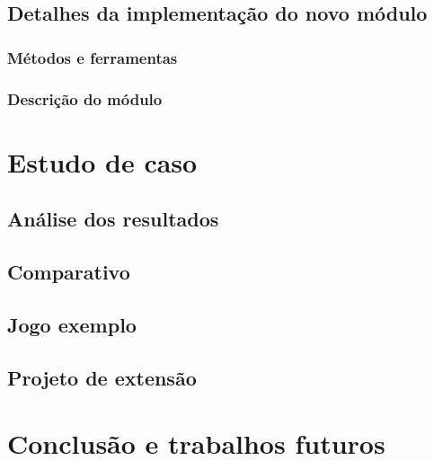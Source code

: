 \documentclass[12pt,twoside,openright,a4paper,english,brazil,sumario=tradicional]{abntex2}
\begin{document}
\section{Detalhes da implementação do novo módulo}
\subsection{Métodos e ferramentas}
\subsection{Descrição do módulo}

\chapter{Estudo de caso}
\label{chap:caso}
\section{Análise dos resultados}
\section{Comparativo}
\section{Jogo exemplo}
\section{Projeto de extensão}

\chapter{Conclusão e trabalhos futuros}
\label{chap:conclcsao}

\postextual

\end{document}
